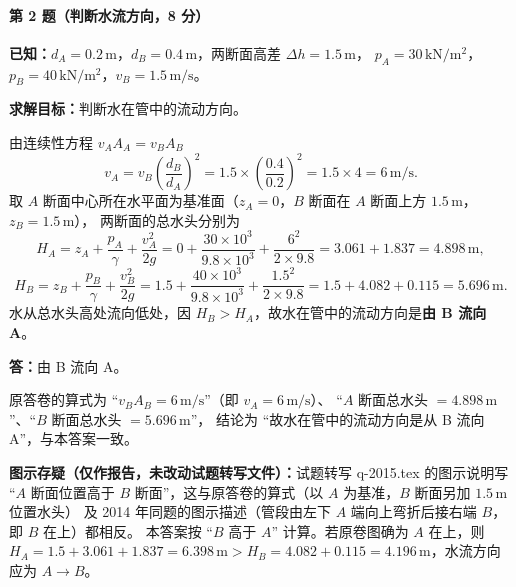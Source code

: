 \paragraph{第 2 题（判断水流方向，8 分）}
\begin{jie}
\textbf{已知：}$d_A=0.2\,\mathrm{m}$，$d_B=0.4\,\mathrm{m}$，两断面高差 $\Delta h=1.5\,\mathrm{m}$，
$p_A=30\,\mathrm{kN/m^{2}}$，$p_B=40\,\mathrm{kN/m^{2}}$，$v_B=1.5\,\mathrm{m/s}$。

\textbf{求解目标：}判断水在管中的流动方向。

由连续性方程 $v_AA_A=v_BA_B$
\[
v_A=v_B\left(\frac{d_B}{d_A}\right)^{2}=1.5\times\left(\frac{0.4}{0.2}\right)^{2}=1.5\times4=6\,\mathrm{m/s}.
\]
取 $A$ 断面中心所在水平面为基准面（$z_A=0$，$B$ 断面在 $A$ 断面上方 $1.5\,\mathrm{m}$，$z_B=1.5\,\mathrm{m}$），
两断面的总水头分别为
\[
H_A=z_A+\frac{p_A}{\gamma}+\frac{v_A^{2}}{2g}
=0+\frac{30\times10^{3}}{9.8\times10^{3}}+\frac{6^{2}}{2\times9.8}
=3.061+1.837=4.898\,\mathrm{m},
\]
\[
H_B=z_B+\frac{p_B}{\gamma}+\frac{v_B^{2}}{2g}
=1.5+\frac{40\times10^{3}}{9.8\times10^{3}}+\frac{1.5^{2}}{2\times9.8}
=1.5+4.082+0.115=5.696\,\mathrm{m}.
\]
水从总水头高处流向低处，因 $H_B>H_A$，故水在管中的流动方向是\textbf{由 B 流向 A}。

\textbf{答：}由 B 流向 A。
\end{jie}

\begin{tishi}
原答卷的算式为 ``$v_BA_B=6\,\mathrm{m/s}$''（即 $v_A=6\,\mathrm{m/s}$）、
``$A$ 断面总水头 $=4.898\,\mathrm{m}$''、``$B$ 断面总水头 $=5.696\,\mathrm{m}$''，
结论为 ``故水在管中的流动方向是从 B 流向 A''，与本答案一致。

\textbf{图示存疑（仅作报告，未改动试题转写文件）：}试题转写 q-2015.tex 的图示说明写
``$A$ 断面位置高于 $B$ 断面''，这与原答卷的算式（以 $A$ 为基准，$B$ 断面另加 $1.5\,\mathrm{m}$ 位置水头）
及 2014 年同题的图示描述（管段由左下 $A$ 端向上弯折后接右端 $B$，即 $B$ 在上）都相反。
本答案按 ``$B$ 高于 $A$'' 计算。若原卷图确为 $A$ 在上，则
$H_A=1.5+3.061+1.837=6.398\,\mathrm{m}>H_B=4.082+0.115=4.196\,\mathrm{m}$，水流方向应为 $A\to B$。
\end{tishi}

